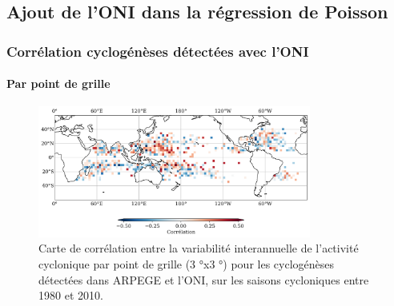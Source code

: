 \documentclass[aspectratio=169, usepdftitle=false, xcolor={dvipsnames}, 9pt,table]{beamer}
\begin{document}
\subsection*{Ajout de l'ONI dans la régression de Poisson}
\begin{frame}[c]
    \frametitle{Corrélation cyclogénèses détectées avec l'ONI}
    \framesubtitle{Par point de grille}
    \begin{figure}
        \centering
        \includegraphics[width=0.8\textwidth]{Figures/Annexes/corr_ONI_tracks.png}
        \caption{\small Carte de corrélation entre la variabilité interannuelle de l’activité cyclonique par point de grille (3 °x3 °) pour les cyclogénèses détectées dans ARPEGE et l’ONI, sur les saisons cycloniques entre 1980 et 2010.}
    \end{figure}
\end{frame}
\end{document}
